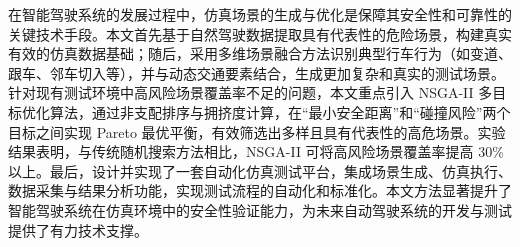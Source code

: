 \begin{abstractzh}

在智能驾驶系统的发展过程中，仿真场景的生成与优化是保障其安全性和可靠性的关键技术手段。本文首先基于自然驾驶数据提取具有代表性的危险场景，构建真实有效的仿真数据基础；随后，采用多维场景融合方法识别典型行车行为（如变道、跟车、邻车切入等），并与动态交通要素结合，生成更加复杂和真实的测试场景。针对现有测试环境中高风险场景覆盖率不足的问题，本文重点引入 NSGA-II 多目标优化算法，通过非支配排序与拥挤度计算，在“最小安全距离”和“碰撞风险”两个目标之间实现 Pareto 最优平衡，有效筛选出多样且具有代表性的高危场景。实验结果表明，与传统随机搜索方法相比，NSGA-II 可将高风险场景覆盖率提高 30\% 以上。最后，设计并实现了一套自动化仿真测试平台，集成场景生成、仿真执行、数据采集与结果分析功能，实现测试流程的自动化和标准化。本文方法显著提升了智能驾驶系统在仿真环境中的安全性验证能力，为未来自动驾驶系统的开发与测试提供了有力技术支撑。


\end{abstractzh}